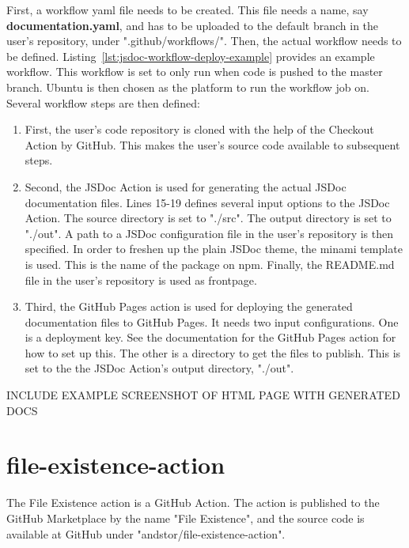First, a workflow yaml file needs to be created. This file needs a name, say \textbf{documentation.yaml}, and has to be uploaded to the default branch in the user's repository, under ".github/workflows/". Then, the actual workflow needs to be defined. Listing~\ref{lst:jsdoc-workflow-deploy-example} provides an example workflow. This workflow is set to only run when code is pushed to the master branch. Ubuntu is then chosen as the platform to run the workflow job on. Several workflow steps are then defined:
\begin{enumerate}
    \item First, the user's code repository is cloned with the help of the Checkout Action by GitHub. This makes the user's source code available to subsequent steps. 
    \item Second, the JSDoc Action is used for generating the actual JSDoc documentation files. Lines 15-19 defines several input options to the JSDoc Action. The source directory is set to "./src". The output directory is set to "./out". A path to a JSDoc configuration file in the user's repository is then specified. In order to freshen up the plain JSDoc theme, the minami template is used. This is the name of the package on npm. Finally, the README.md file in the user's repository is used as frontpage. 
    \item Third, the GitHub Pages action is used for deploying the generated documentation files to GitHub Pages. It needs two input configurations. One is a deployment key. See the documentation for the GitHub Pages action for how to set up this. The other is a directory to get the files to publish. This is set to the the JSDoc Action's output directory, "./out".
\end{enumerate}

INCLUDE EXAMPLE SCREENSHOT OF HTML PAGE WITH GENERATED DOCS




\section{file-existence-action}
The File Existence action is a GitHub Action. The action is published to the GitHub Marketplace by the name "File Existence", and the source code is available at GitHub under "andstor/file-existence-action".

